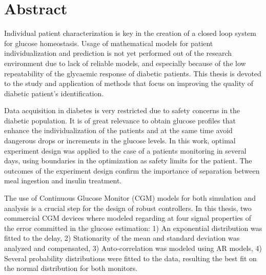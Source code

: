 \chapter*{Abstract}
\label{sec:Abstract}


Individual patient characterization is key in the creation of a closed loop system for glucose homeostasis. Usage of mathematical models for patient individualization and prediction is not yet performed out of the research environment due to lack of reliable models, and especially because of the low repeatability of the glycaemic response of diabetic patients. This thesis is devoted to the study and application of methods that focus on improving the quality of diabetic patient's identification.


Data acquisition in diabetes is very restricted due to safety concerns in the diabetic population. It is of great relevance to obtain glucose profiles that enhance the individualization of the patients and at the same time avoid dangerous drops or increments in the glucose levels. In this work, optimal experiment design was applied to the case of a patients monitoring in several days, using boundaries in the optimization as safety limits for the patient. The outcomes of the experiment design confirm the importance of separation between meal ingestion and insulin treatment.%

The use of Continuous Glucose Monitor (CGM) models for both simulation and analysis is a crucial step for the design of robust controllers. In this thesis, two commercial CGM devices where modeled regarding at four signal properties of the error committed in the glucose estimation: 1) An exponential distribution was fitted to the delay, 2) Stationarity of the mean and standard deviation was analyzed and compensated, 3) Auto-correlation was modeled using AR models, 4) Several probability distributions were fitted to the data, resulting the best fit on the normal distribution for both monitors.

